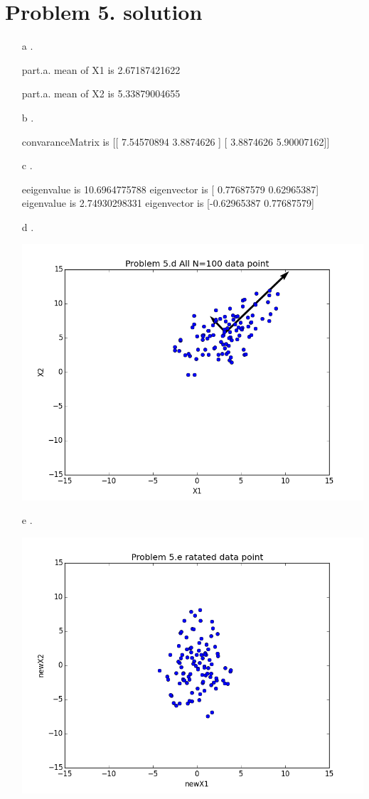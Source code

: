 \documentclass[11pt]{article}
\begin{document}
\section*{Problem 5. solution}
\begin{itemize}
\item[a].

part.a. mean of X1 is 2.67187421622

part.a. mean of X2 is 5.33879004655

\item[b].

 convaranceMatrix is 
 [[ 7.54570894  3.8874626 ]
 [ 3.8874626   5.90007162]]

\item[c].

eeigenvalue is  10.6964775788 eigenvector is  [ 0.77687579  0.62965387]
eigenvalue is  2.74930298331 eigenvector is  [-0.62965387  0.77687579]

\item[d].

\includegraphics[scale=0.55]{q54}

\item[e].

\includegraphics[scale=0.55]{q55}

\end{itemize}
\end{document}
